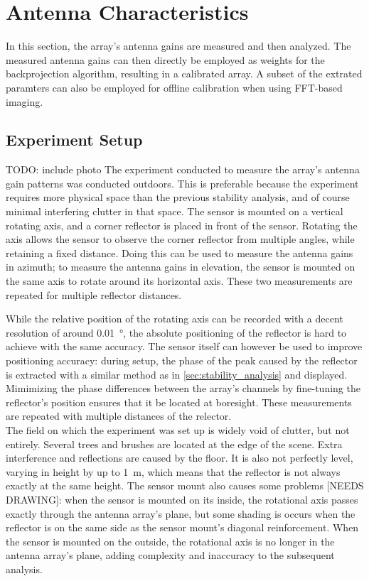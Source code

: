 \newblock
\section{Antenna Characteristics}
\label{sec:calibration}

In this section, the array's antenna gains are measured and then analyzed.
The measured antenna gains can then directly be employed as weights for the backprojection algorithm,
resulting in a calibrated array.
A subset of the extrated paramters can also be employed for offline calibration when using FFT-based imaging.

\subsection{Experiment Setup}
TODO: include photo
The experiment conducted to measure the array's antenna gain patterns was conducted outdoors.
This is preferable because the experiment requires more physical space than the previous stability analysis, 
and of course minimal interfering clutter in that space.
The sensor is mounted on a vertical rotating axis, and a corner reflector is placed in front of the sensor.
Rotating the axis allows the sensor to observe the corner reflector from multiple angles, while retaining a fixed distance.
Doing this can be used to measure the antenna gains in azimuth;
to measure the antenna gains in elevation, the sensor is mounted on the same axis to rotate around its horizontal axis.
These two measurements are repeated for multiple reflector distances.

While the relative position of the rotating axis can be recorded with a decent resolution of around \SI{0.01}{\degree},
the absolute positioning of the reflector is hard to achieve with the same accuracy.
The sensor itself can however be used to improve positioning accuracy:
during setup, the phase of the peak caused by the reflector
is extracted with a similar method as in \autoref{sec:stability_analysis} and displayed.
Mimimizing the phase differences between the array's channels by fine-tuning the reflector's position
ensures that it be located at boresight.
These measurements are repeated with multiple distances of the relector.\\

The field on which the experiment was set up is widely void of clutter, but not entirely.
Several trees and brushes are located at the edge of the scene.
Extra interference and reflections are caused by the floor.
It is also not perfectly level, varying in height by up to \SI{1}{\meter},
which means that the reflector is not always exactly at the same height.
The sensor mount also causes some problems [NEEDS DRAWING]:
when the sensor is mounted on its inside,
the rotational axis passes exactly through the antenna array's plane,
but some shading is occurs when the reflector is on the same side as the sensor mount's diagonal reinforcement.
When the sensor is mounted on the outside,
the rotational axis is no longer in the antenna array's plane,
adding complexity and inaccuracy to the subsequent analysis.

